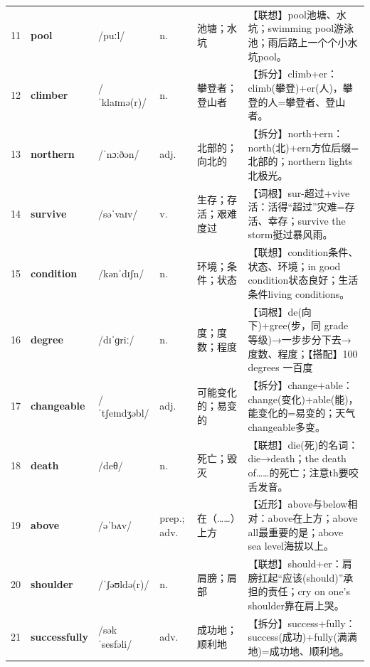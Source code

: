 \documentclass[UTF8,a4paper,11pt,oneside]{ctexbook}
\newcommand{\cellword}[1]{{\bfseries\textcolor{wordcol}{#1}}}
\newcommand{\cellipa}[1]{{\footnotesize\textcolor{ipacol}{#1}}}
\newcommand{\cellpos}[1]{\textcolor{poscol}{#1}}
\newcommand{\cellno}[1]{\textcolor{volcolor!75!black}{#1}}
\begin{document}
{\begin{longtable}{@{}C{0.045\textwidth}L{0.155\textwidth}L{0.175\textwidth}C{0.070\textwidth}L{0.180\textwidth}L{0.282\textwidth}@{}}
 \cellno{11} & \cellword{pool} & \cellipa{/puːl/} & \cellpos{n.} & 池塘；水坑 & \textcolor{tagAssoc}{【联想】}pool池塘、水坑；swimming pool游泳池；雨后路上一个个小水坑pool。 \\
\cellno{12} & \cellword{climber} & \cellipa{/ˈklaɪmə(r)/} & \cellpos{n.} & 攀登者；登山者 & \textcolor{tagSplit}{【拆分】}climb+er：climb(攀登)+er(人)，攀登的人=攀登者、登山者。 \\
 \cellno{13} & \cellword{northern} & \cellipa{/ˈnɔːðən/} & \cellpos{adj.} & 北部的；向北的 & \textcolor{tagSplit}{【拆分】}north+ern：north(北)+ern方位后缀=北部的；northern lights北极光。 \\
\cellno{14} & \cellword{survive} & \cellipa{/səˈvaɪv/} & \cellpos{v.} & 生存；存活；艰难度过 & \textcolor{tagRoot}{【词根】}sur-超过+vive活：活得“超过”灾难=存活、幸存；survive the storm挺过暴风雨。 \\
 \cellno{15} & \cellword{condition} & \cellipa{/kənˈdɪʃn/} & \cellpos{n.} & 环境；条件；状态 & \textcolor{tagAssoc}{【联想】}condition条件、状态、环境；in good condition状态良好；生活条件living conditions。 \\
\cellno{16} & \cellword{degree} & \cellipa{/dɪˈɡriː/} & \cellpos{n.} & 度；度数；程度 & \textcolor{tagRoot}{【词根】}de(向下)+gree(步，同 grade 等级)→\allowbreak{}一步步分下去→\allowbreak{}度数、程度；\textcolor{tagColloc}{【搭配】}100 degrees 一百度 \\
 \cellno{17} & \cellword{changeable} & \cellipa{/ˈtʃeɪndʒəbl/} & \cellpos{adj.} & 可能变化的；易变的 & \textcolor{tagSplit}{【拆分】}change+able：change(变化)+able(能)，能变化的=易变的；天气changeable多变。 \\
\cellno{18} & \cellword{death} & \cellipa{/deθ/} & \cellpos{n.} & 死亡；毁灭 & \textcolor{tagAssoc}{【联想】}die(死)的名词：die→\allowbreak{}death；the death of……的死亡；注意th要咬舌发音。 \\
 \cellno{19} & \cellword{above} & \cellipa{/əˈbʌv/} & \cellpos{prep.;\allowbreak{} adv.} & 在（……）上方 & \textcolor{tagNear}{【近形】}above与below相对：above在上方；above all最重要的是；above sea level海拔以上。 \\
\cellno{20} & \cellword{shoulder} & \cellipa{/ˈʃəʊldə(r)/} & \cellpos{n.} & 肩膀；肩部 & \textcolor{tagAssoc}{【联想】}should+er：肩膀扛起“应该(should)”承担的责任；cry on one's shoulder靠在肩上哭。 \\
 \cellno{21} & \cellword{successfully} & \cellipa{/səkˈsesfəli/} & \cellpos{adv.} & 成功地；顺利地 & \textcolor{tagSplit}{【拆分】}success+fully：success(成功)+fully(满满地)=成功地、顺利地。 \\

\end{longtable}}
\end{document}
